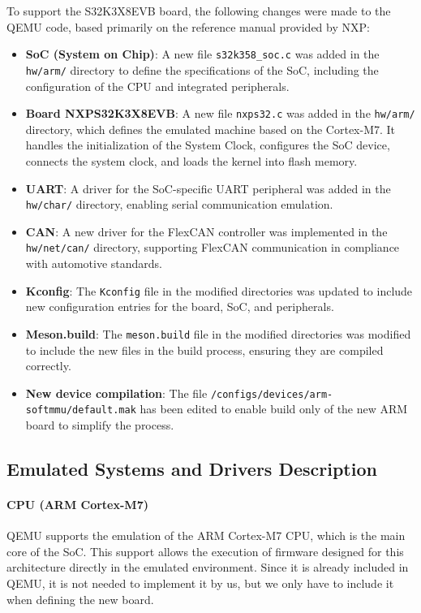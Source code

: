 To support the S32K3X8EVB board, the following changes were made to the QEMU code, based primarily on the reference manual \cite{nxpS32K3} provided by NXP:

\begin{itemize}
    \item \textbf{SoC (System on Chip)}: A new file \texttt{s32k358\_soc.c} was added in the \texttt{hw/arm/} directory to define the specifications of the SoC, including the configuration of the CPU and integrated peripherals.
    \item \textbf{Board NXPS32K3X8EVB}: A new file \texttt{nxps32.c} was added in the \texttt{hw/arm/} directory, which defines the emulated machine based on the Cortex-M7. It handles the initialization of the System Clock, configures the SoC device, connects the system clock, and loads the kernel into flash memory.
    \item \textbf{UART}: A driver for the SoC-specific UART peripheral was added in the \texttt{hw/char/} directory, enabling serial communication emulation.
    \item \textbf{CAN}: A new driver for the FlexCAN controller was implemented in the \texttt{hw/net/can/} directory, supporting FlexCAN communication in compliance with automotive standards.
    \item \textbf{Kconfig}: The \texttt{Kconfig} file in the modified directories was updated to include new configuration entries for the board, SoC, and peripherals.
    \item \textbf{Meson.build}: The \texttt{meson.build} file in the modified directories was modified to include the new files in the build process, ensuring they are compiled correctly.
    \item \textbf{New device compilation}: The file \texttt{/configs/devices/arm-softmmu/default.mak} has been edited to enable build only of the new ARM board to simplify the process.
\end{itemize}


\subsection{Emulated Systems and Drivers Description}

\paragraph{CPU (ARM Cortex-M7)}
QEMU supports the emulation of the ARM Cortex-M7 CPU, which is the main core of the SoC. This support allows the execution of firmware designed for this architecture directly in the emulated environment. Since it is already included in QEMU, it is not needed to implement it by us, but we only have to include it when defining the new board.

